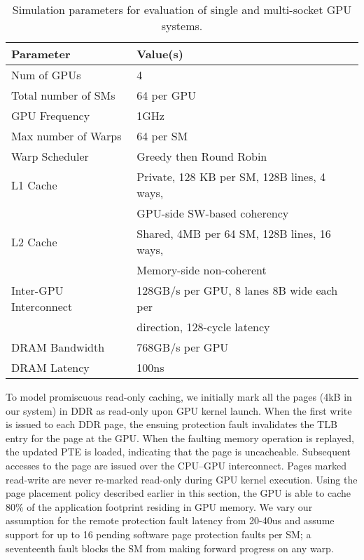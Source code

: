 \begin{table}[h]
\begin{small}
\centering
\begin{tabular}{ll}
\toprule
\textbf{Parameter} & \textbf{Value(s)} \\
\toprule
Num of GPUs & 4 \\
\midrule
Total number of SMs & 64 per GPU \\
\midrule
GPU Frequency & 1GHz \\
\midrule
Max number of Warps & 64 per SM \\
\midrule
Warp Scheduler & Greedy then Round Robin \\
\midrule
L1 Cache & Private, 128 KB per SM, 128B lines, 4 ways, \\ & GPU-side SW-based coherency \\
\midrule
L2 Cache & Shared, 4MB per 64 SM, 128B lines, 16 ways, \\ & Memory-side non-coherent\\
\midrule
Inter-GPU Interconnect & 128GB/s per GPU, 8 lanes 8B wide each per \\ & direction, 128-cycle latency \\
\midrule
DRAM Bandwidth & 768GB/s per GPU\\
\midrule
DRAM Latency & 100ns \\
\toprule
\end{tabular}
\caption{Simulation parameters for evaluation of single and multi-socket GPU systems.}
\label{tab:setup}
\end{small}
\end{table}

To model promiscuous read-only caching, we initially mark all the pages (4kB
in our system) in DDR as read-only upon GPU kernel launch. When the first 
write is issued to each DDR page, the ensuing
protection fault invalidates the TLB entry for the page at the GPU. 
When the faulting memory operation is replayed, the updated 
PTE is loaded, indicating that the page is uncacheable.  Subsequent accesses
to the page are issued over the CPU--GPU interconnect.
Pages marked read-write are never re-marked
read-only during GPU kernel execution. Using the page placement policy described
earlier in this section, the GPU is able to cache 80\% of the application footprint residing
in GPU memory. We vary our assumption for the remote protection fault latency from
20-40us and assume support for up to 16 pending software
page protection faults per SM; a seventeenth fault blocks the SM from making forward
progress on any warp.

